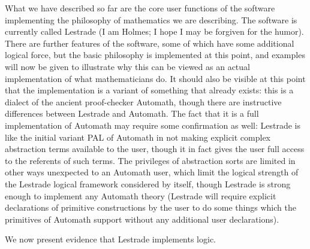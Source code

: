 \documentclass[12pt]{article}
\begin{document}
What we have described so far are the core user functions of the software implementing the philosophy of mathematics we are describing.  The software is currently called Lestrade (I am Holmes; I hope I may be forgiven for the humor).   There are further features of the software, some of which have some additional logical force, but the basic philosophy is implemented at this point, and examples will now be given to illustrate why this can be viewed as an actual implementation of what mathematicians do.  It should also be visible at this point that the implementation is a variant of something that already exists:  this is a dialect of the ancient proof-checker Automath, though there are instructive differences between Lestrade and Automath.  The fact that it is a full implementation of Automath may require some confirmation as well:  Lestrade is like the initial variant PAL of Automath in not making explicit complex abstraction terms available to the user, though it in fact gives the user full access to the referents of such terms.   The privileges of abstraction sorts are limited in other ways unexpected to an Automath user, which limit the logical strength of the Lestrade logical framework considered by itself, though Lestrade is strong enough to implement any Automath theory (Lestrade will require explicit declarations of primitive constructions by the user to do some things which the primitives of Automath support without any additional user declarations).

We now present evidence that Lestrade implements logic.
\end{document}
